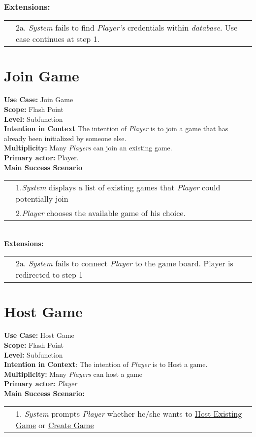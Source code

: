 \documentclass{article}
\begin{document}
	\subsubsection*{Extensions:}
	\begin{tabular}{l l}
		&2a. \textit{System} fails to find \textit{Player's} credentials within \textit{database}. Use case continues at step 1.
	\end{tabular}
	\section*{Join Game}
	\textbf{Use Case:} Join Game\\
	\textbf{Scope:}
	Flash Point\\
	\textbf{Level:}
	Subfunction\\
	\textbf{Intention in Context}
	The intention of \textit{Player} is to join a game that has already been initialized by someone else.\\
	\textbf{Multiplicity:}
	Many \textit{Players} can join an existing game.\\
	\textbf{Primary actor: }
	Player.\\
	\textbf{Main Success Scenario}\\
	\begin{tabular}{l l}
		&1.\textit{System} displays a list of existing games that \textit{Player} could potentially join\\
		&2.\textit{Player} chooses the available game of his choice.
	\end{tabular}\\
	\textbf{Extensions:}\\
	\begin{tabular}{l l}
		&2a. \textit{System} fails to connect \textit{Player} to the game board. Player is redirected to step 1\\
	\end{tabular}
	
	\section*{Host Game}
	\textbf{Use Case:}  Host Game\\
	\textbf{Scope:} Flash Point\\
	\textbf{Level:} Subfunction\\
	\textbf{Intention in Context}: 
	The intention of \textit{Player} is to Host a game.\\
	\textbf{Multiplicity:} Many \textit{Players} can host a game\\
	\textbf{Primary actor:} \textit{Player}\\
	\textbf{Main Success Scenario:}\\
	\begin{tabular}{l l}
		&1. \textit{System} prompts \textit{Player} whether he/she wants to \underline{Host Existing Game} or \underline{Create Game}\\
	\end{tabular}
\end{document}
